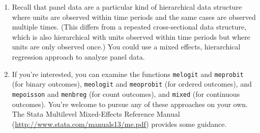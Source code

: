 \documentclass[a4paper,12pt]{article}
\begin{document}
\begin{enumerate}
\item Recall that panel data are a particular kind of hierarchical data structure where units are observed within time periods and the same cases are observed multiple times. (This differs from a repeated cross-sectional data structure, which is also hierarchical with units observed within time periods but where units are only observed once.) You could use a mixed effects, hierarchical regression approach to analyze panel data.

\item If you're interested, you can examine the functions \texttt{melogit} and \texttt{meprobit} (for binary outcomes), \texttt{meologit} and \texttt{meoprobit} (for ordered outcomes), and \texttt{mepoisson} and \texttt{menbreg} (for count outcomes), and \texttt{mixed} (for continuous outcomes). You're welcome to pursue any of these approaches on your own. The Stata Multilevel Mixed-Effects Reference Manual (\url{http://www.stata.com/manuals13/me.pdf}) provides some guidance.

\end{enumerate}
\end{document}
